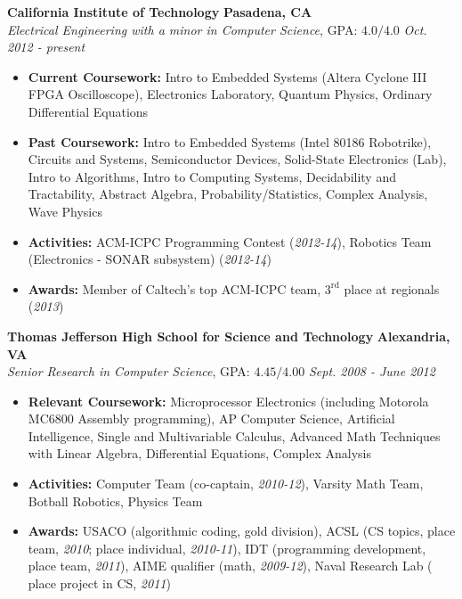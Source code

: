 \documentclass{article}
\newenvironment{changemargin}[2]{%
  \begin{list}{}{%
    \setlength{\topsep}{0pt}%
    \setlength{\leftmargin}{#1}%
    \setlength{\rightmargin}{#2}%
    \setlength{\listparindent}{\parindent}%
    \setlength{\itemindent}{\parindent}%
    \setlength{\parsep}{\parskip}%
  }%
  \item[]}{\end{list}
}
\newenvironment{body} {
	\vspace*{-16pt}
	\begin{changemargin}{-0.25in}{-0.5in}
  }	
	{\end{changemargin}
}
\begin{document}
\begin{body}
	\vspace{14pt}
	\textbf{California Institute of Technology} \hfill \textbf{Pasadena, CA}{} \\
	\emph{Electrical Engineering with a minor in Computer Science}, GPA: $4.0/4.0$ \hfill \emph{Oct. 2012 - present} \\
	\begin{itemize}
	\item \textbf{Current Coursework:} Intro to Embedded Systems (Altera Cyclone III FPGA Oscilloscope), Electronics Laboratory, Quantum Physics, Ordinary Differential Equations
	\item \textbf{Past Coursework:} Intro to Embedded Systems (Intel 80186 Robotrike), Circuits and Systems, Semiconductor Devices, Solid-State Electronics (Lab), Intro to Algorithms, Intro to Computing Systems, Decidability and Tractability, Abstract Algebra, Probability/Statistics, Complex Analysis, Wave Physics
	\item \textbf{Activities:} ACM-ICPC Programming Contest (\textit{2012-14}), Robotics Team (Electronics - SONAR subsystem) (\textit{2012-14})
	\item \textbf{Awards:} Member of Caltech's top ACM-ICPC team, $3^\text{rd}$ place at regionals (\textit{2013})
	\end{itemize}

	\medskip

	\textbf{Thomas Jefferson High School for Science and Technology} \hfill \textbf{Alexandria, VA} \\
	\emph{Senior Research in Computer Science}, GPA: $4.45/4.00$ \hfill \emph{Sept. 2008 - June 2012} \\
	\begin{itemize}
	\item \textbf{Relevant Coursework:} Microprocessor Electronics (including Motorola MC6800 Assembly programming), AP Computer Science, Artificial Intelligence, Single and Multivariable Calculus, Advanced Math Techniques with Linear Algebra, Differential Equations, Complex Analysis
	\item \textbf{Activities:} Computer Team (co-captain, \textit{2010-12}), Varsity Math Team, Botball Robotics, Physics Team
	\item \textbf{Awards:} USACO (algorithmic coding, gold division), ACSL (CS topics,  place team, \textit{2010};  place individual, \textit{2010-11}), IDT (programming development,  place team, \textit{2011}), AIME qualifier (math, \textit{2009-12}), Naval Research Lab ( place project in CS, \textit{2011})
	\end{itemize}
\end{body}
\end{document}

